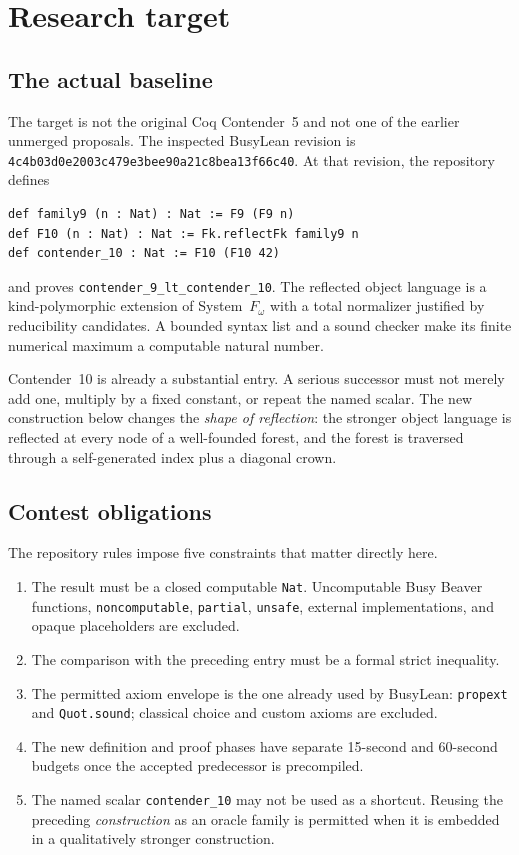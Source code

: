 \documentclass[11pt]{article}
\theoremstyle{definition}
\theoremstyle{remark}
\newcommand{\code}[1]{\texttt{#1}}
\newcommand{\pin}{\texttt{4c4b03d0e2003c479e3bee90a21c8bea13f66c40}}
\begin{document}
\tableofcontents

\section{Research target}

\subsection{The actual baseline}

The target is not the original Coq Contender~5 and not one of the earlier
unmerged proposals.  The inspected BusyLean revision is \pin.  At that
revision, the repository defines
\begin{lstlisting}
def family9 (n : Nat) : Nat := F9 (F9 n)
def F10 (n : Nat) : Nat := Fk.reflectFk family9 n
def contender_10 : Nat := F10 (F10 42)
\end{lstlisting}
and proves \code{contender\_9\_lt\_contender\_10}.  The reflected object
language is a kind-polymorphic extension of System~$F_\omega$ with a total
normalizer justified by reducibility candidates.  A bounded syntax list and a
sound checker make its finite numerical maximum a computable natural number.

Contender~10 is already a substantial entry.  A serious successor must not
merely add one, multiply by a fixed constant, or repeat the named scalar.  The
new construction below changes the 
\emph{shape of reflection}: the stronger object language is reflected at every
node of a well-founded forest, and the forest is traversed through a
self-generated index plus a diagonal crown.

\subsection{Contest obligations}

The repository rules impose five constraints that matter directly here.

\begin{enumerate}
\item The result must be a closed computable \code{Nat}.  Uncomputable Busy
  Beaver functions, \code{noncomputable}, \code{partial}, \code{unsafe},
  external implementations, and opaque placeholders are excluded.
\item The comparison with the preceding entry must be a formal strict
  inequality.
\item The permitted axiom envelope is the one already used by BusyLean:
  \code{propext} and \code{Quot.sound}; classical choice and custom axioms are
  excluded.
\item The new definition and proof phases have separate 15-second and
  60-second budgets once the accepted predecessor is precompiled.
\item The named scalar \code{contender\_10} may not be used as a shortcut.
  Reusing the preceding \emph{construction} as an oracle family is permitted
  when it is embedded in a qualitatively stronger construction.
\end{enumerate}
\end{document}
